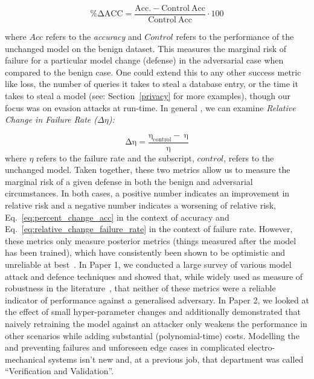 \begin{equation}
    \label{eq:percent_change_acc}
    \mathrm{\%\Delta ACC = 
        \frac{Acc.-Control~Acc}{Control~Acc}} \cdot 100
\end{equation}

where $Acc$ refers to the \textit{accuracy} and $Control$ refers to the performance of the unchanged model on the benign dataset. This measures the marginal risk of failure for a particular model change (defense) in the adversarial case when compared to the benign case. One could extend this to any other success metric like loss, the number of queries it takes to steal a database entry, or the time it takes to steal a model (see: Section~\ref{privacy} for more examples), though our focus was on evasion attacks at run-time. In general \cite{meyers}, we can examine \textit{Relative Change in Failure Rate ($ \Delta \eta$):}

\begin{equation}
\label{eq:relative_change_failure_rate}
\mathrm{\Delta \eta} = 
    \frac{\mathrm{\eta_{control}-~\eta}}{\mathrm{\eta}}
\end{equation}
where $\eta$ refers to the failure rate and the subscript, $control$, refers to the unchanged model. Taken together, these two metrics allow us to measure the marginal risk of a given defense in both the benign and adversarial circumstances. In both cases, a positive number indicates an improvement in relative risk and a negative number indicates a worsening of relative risk, Eq.~\ref{eq:percent_change_acc} in the context of accuracy and Eq.~\ref{eq:relative_change_failure_rate} in the context of failure rate. However, these metrics only measure posterior metrics (things measured after the model has been trained), which have consistently been shown to be optimistic and unreliable at best~\cite{}. In Paper 1, we conducted a large survey of various model attack and defence techniques and showed that, while widely used as measure of robustness in the literature~\cite{}, that neither of these metrics were a reliable indicator of performance against a generalised adversary. In Paper 2, we looked at the effect of small hyper-parameter changes and additionally demonstrated that naively retraining the model against an attacker only weakens the performance in other scenarios while adding substantial (polynomial-time) costs. Modelling the and preventing failures and unforeseen edge cases in complicated electro-mechanical systems isn't new and, at a previous job, that department was called ``Verification and Validation''.  

